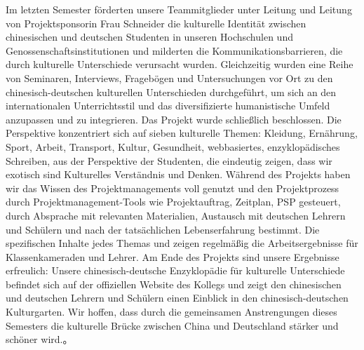 \par
\noindent
Im letzten Semester förderten unsere Teammitglieder unter Leitung und Leitung von Projektsponsorin Frau Schneider die kulturelle Identität zwischen chinesischen und deutschen Studenten in unseren Hochschulen und Genossenschaftsinstitutionen und milderten die Kommunikationsbarrieren, die durch kulturelle Unterschiede verursacht wurden. Gleichzeitig wurden eine Reihe von Seminaren, Interviews, Fragebögen und Untersuchungen vor Ort zu den chinesisch-deutschen kulturellen Unterschieden durchgeführt, um sich an den internationalen Unterrichtsstil und das diversifizierte humanistische Umfeld anzupassen und zu integrieren. Das Projekt wurde schließlich beschlossen. Die Perspektive konzentriert sich auf sieben kulturelle Themen: Kleidung, Ernährung, Sport, Arbeit, Transport, Kultur, Gesundheit, webbasiertes, enzyklopädisches Schreiben, aus der Perspektive der Studenten, die eindeutig zeigen, dass wir exotisch sind Kulturelles Verständnis und Denken. Während des Projekts haben wir das Wissen des Projektmanagements voll genutzt und den Projektprozess durch Projektmanagement-Tools wie Projektauftrag, Zeitplan, PSP gesteuert, durch Absprache mit relevanten Materialien, Austausch mit deutschen Lehrern und Schülern und nach der tatsächlichen Lebenserfahrung bestimmt. Die spezifischen Inhalte jedes Themas und zeigen regelmäßig die Arbeitsergebnisse für Klassenkameraden und Lehrer. Am Ende des Projekts sind unsere Ergebnisse erfreulich: Unsere chinesisch-deutsche Enzyklopädie für kulturelle Unterschiede befindet sich auf der offiziellen Website des Kollegs und zeigt den chinesischen und deutschen Lehrern und Schülern einen Einblick in den chinesisch-deutschen Kulturgarten. Wir hoffen, dass durch die gemeinsamen Anstrengungen dieses Semesters die kulturelle Brücke zwischen China und Deutschland stärker und schöner wird.。
 \par 
 \noindent
